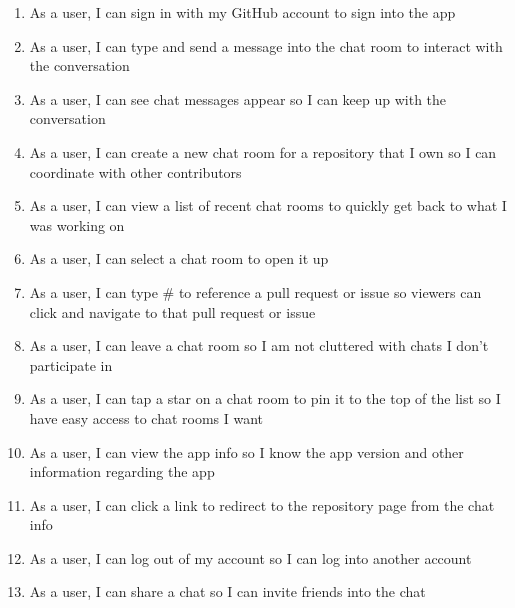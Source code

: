 \documentclass{report}
\begin{document}
\begin{enumerate}
    \item As a user, I can sign in with my GitHub account to sign into the app
    \item As a user, I can type and send a message into the chat room to interact with the conversation
    \item As a user, I can see chat messages appear so I can keep up with the conversation
    \item As a user, I can create a new chat room for a repository that I own so I can coordinate with other contributors
    \item As a user, I can view a list of recent chat rooms to quickly get back to what I was working on
    \item As a user, I can select a chat room to open it up
    \item As a user, I can type \# to reference a pull request or issue so viewers can click and navigate to that pull request or issue
    \item As a user, I can leave a chat room so I am not cluttered with chats I don't participate in
    \item As a user, I can tap a star on a chat room to pin it to the top of the list so I have easy access to chat rooms I want
    \item As a user, I can view the app info so I know the app version and other information regarding the app
    \item As a user, I can click a link to redirect to the repository page from the chat info
    \item As a user, I can log out of my account so I can log into another account
    \item As a user, I can share a chat so I can invite friends into the chat
\end{enumerate}
\end{document}
